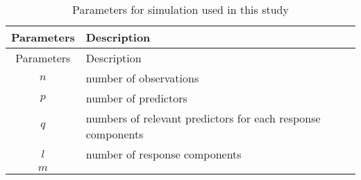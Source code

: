 \documentclass[12pt,a4paperpaper,authoryear]{elsarticle} %
\begin{document}
\begin{longtable}[]{@{}cl@{}}
\caption{\label{tab:parameters} Parameters for simulation used in this
study}\tabularnewline
\toprule
\begin{minipage}[b]{0.14\columnwidth}\centering\strut
Parameters\strut
\end{minipage} & \begin{minipage}[b]{0.80\columnwidth}\raggedright\strut
Description\strut
\end{minipage}\tabularnewline
\midrule
\endfirsthead
\toprule
\begin{minipage}[b]{0.14\columnwidth}\centering\strut
Parameters\strut
\end{minipage} & \begin{minipage}[b]{0.80\columnwidth}\raggedright\strut
Description\strut
\end{minipage}\tabularnewline
\midrule
\endhead
\begin{minipage}[t]{0.14\columnwidth}\centering\strut
\(n\)\strut
\end{minipage} & \begin{minipage}[t]{0.80\columnwidth}\raggedright\strut
number of observations\strut
\end{minipage}\tabularnewline
\begin{minipage}[t]{0.14\columnwidth}\centering\strut
\(p\)\strut
\end{minipage} & \begin{minipage}[t]{0.80\columnwidth}\raggedright\strut
number of predictors\strut
\end{minipage}\tabularnewline
\begin{minipage}[t]{0.14\columnwidth}\centering\strut
\(q\)\strut
\end{minipage} & \begin{minipage}[t]{0.80\columnwidth}\raggedright\strut
numbers of relevant predictors for each response components\strut
\end{minipage}\tabularnewline
\begin{minipage}[t]{0.14\columnwidth}\centering\strut
\(l\)\strut
\end{minipage} & \begin{minipage}[t]{0.80\columnwidth}\raggedright\strut
number of response components\strut
\end{minipage}\tabularnewline
\begin{minipage}[t]{0.14\columnwidth}\centering\strut
\(m\)\strut
\end{minipage} & \begin{minipage}[t]{0.80\columnwidth}\raggedright\strut

\end{minipage}
\end{longtable}
\end{document}
